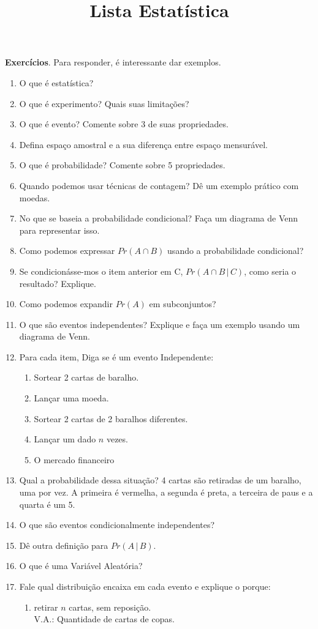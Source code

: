 \documentclass[11pt, a4paper]{article}
\begin{document}
\title{Lista Estatística}
\date{}
\maketitle
\textbf{Exercícios}.
Para responder, é interessante dar exemplos.
\begin{enumerate}
\item O que é estatística?

\item O que é experimento? Quais suas limitações?
\item O que é evento? Comente sobre 3 de suas propriedades.
\item Defina espaço amostral e a sua diferença entre espaço mensurável.
\item O que é probabilidade? Comente sobre 5 propriedades.
\item Quando podemos usar técnicas de contagem? Dê um exemplo prático com moedas.
\item No que se baseia a probabilidade condicional? Faça um diagrama de Venn para representar isso.
\item Como podemos expressar $Pr(A\cap B)$ usando a probabilidade condicional?
\item Se condicionásse-mos o item anterior em C, $Pr(A\cap B\,|\,C)$, como seria o resultado? Explique.
\item Como podemos expandir $Pr(A)$ em subconjuntos?

\item O que são eventos independentes? Explique e faça um exemplo usando um diagrama de Venn.
\item Para cada item, Diga se é um evento Independente:
	\begin{enumerate}
	\item Sortear 2 cartas de baralho.
	\item Lançar uma moeda.
	\item Sortear 2 cartas de 2 baralhos diferentes.
	\item Lançar um dado $n$ vezes.
	\item O mercado financeiro
	\end{enumerate}
\item Qual a probabilidade dessa situação? 4 cartas são retiradas de um baralho, uma por vez. A primeira é vermelha, a segunda é preta, a terceira de paus e a quarta é um 5.
\item O que são eventos condicionalmente independentes?
\item Dê outra definição para $Pr(A\,|\,B)$.
\item O que é uma Variável Aleatória?
\item Fale qual distribuição encaixa em cada evento e explique o porque:
	\begin{enumerate}
	\item retirar $n$ cartas, sem reposição. 
	\\V.A.: Quantidade de cartas de copas.
	

\end{enumerate}
\end{enumerate}
\end{document}
